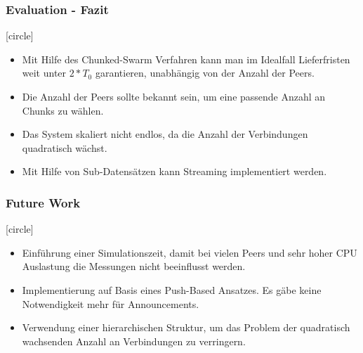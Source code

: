 
\begin{frame}
  \frametitle{Evaluation - Fazit}
  [circle]
  \begin{itemize}
	  \item Mit Hilfe des Chunked-Swarm Verfahren kann man im Idealfall Lieferfristen weit unter $2*T_0$ garantieren, unabhängig von der Anzahl der Peers.
	  \item Die Anzahl der Peers sollte bekannt sein, um eine passende Anzahl an Chunks zu wählen.
	  \item Das System skaliert nicht endlos, da die Anzahl der Verbindungen quadratisch wächst.
	  \item Mit Hilfe von Sub-Datensätzen kann Streaming implementiert werden.
  \end{itemize}
\end{frame}


\begin{frame}
  \frametitle{Future Work}
  [circle]
  \begin{itemize}
	  \item Einführung einer Simulationszeit, damit bei vielen Peers und sehr hoher CPU Auslastung die Messungen nicht beeinflusst werden.
	  \item Implementierung auf Basis eines Push-Based Ansatzes. Es gäbe keine Notwendigkeit mehr für Announcements.
	  \item Verwendung einer hierarchischen Struktur, um das Problem der quadratisch wachsenden Anzahl an Verbindungen zu verringern.
  \end{itemize}
\end{frame}
